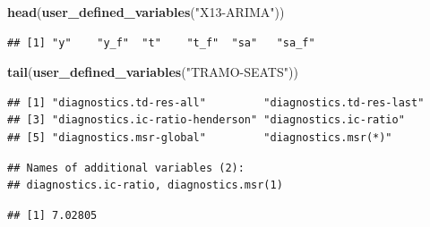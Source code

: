 \documentclass[10pt,xcolor=table,color={dvipsnames,usenames},ignorenonframetext,usepdftitle=false,french]{beamer}
\newenvironment{Shaded}{\begin{snugshade}}{\end{snugshade}}
\newcommand{\DataTypeTok}[1]{\textcolor[rgb]{0.13,0.29,0.53}{#1}}
\newcommand{\KeywordTok}[1]{\textcolor[rgb]{0.13,0.29,0.53}{\textbf{#1}}}
\newcommand{\NormalTok}[1]{#1}
\newcommand{\OperatorTok}[1]{\textcolor[rgb]{0.81,0.36,0.00}{\textbf{#1}}}
\newcommand{\StringTok}[1]{\textcolor[rgb]{0.31,0.60,0.02}{#1}}
\begin{document}
\begin{Shaded}
\begin{Highlighting}[]
\KeywordTok{head}\NormalTok{(}\KeywordTok{user_defined_variables}\NormalTok{(}\StringTok{"X13-ARIMA"}\NormalTok{))}
\end{Highlighting}
\end{Shaded}

\begin{verbatim}
## [1] "y"    "y_f"  "t"    "t_f"  "sa"   "sa_f"
\end{verbatim}

\begin{Shaded}
\begin{Highlighting}[]
\KeywordTok{tail}\NormalTok{(}\KeywordTok{user_defined_variables}\NormalTok{(}\StringTok{"TRAMO-SEATS"}\NormalTok{))}
\end{Highlighting}
\end{Shaded}

\begin{verbatim}
## [1] "diagnostics.td-res-all"         "diagnostics.td-res-last"       
## [3] "diagnostics.ic-ratio-henderson" "diagnostics.ic-ratio"          
## [5] "diagnostics.msr-global"         "diagnostics.msr(*)"
\end{verbatim}

\begin{Shaded}
\end{Shaded}

\begin{verbatim}
## Names of additional variables (2):
## diagnostics.ic-ratio, diagnostics.msr(1)
\end{verbatim}

\begin{Shaded}
\end{Shaded}

\begin{verbatim}
## [1] 7.02805
\end{verbatim}
\end{document}
